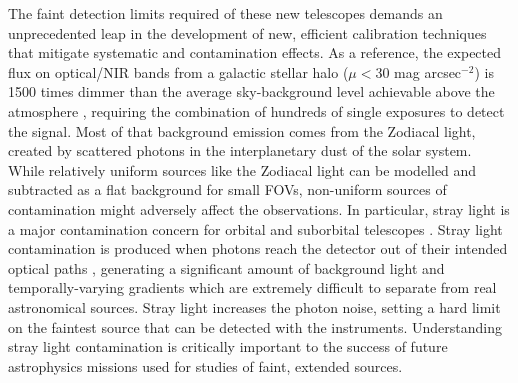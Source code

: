 \documentclass[usenames,dvipsnames,modern]{CLASS_FILES/aastex631}  %
\newcommand{\magarc}{mag arcsec\ensuremath{^{\mathrm{-2}}}}
\begin{document}
The faint detection limits required of these new telescopes demands an unprecedented leap in the development of new, efficient calibration techniques that mitigate systematic and contamination effects. As a reference, the expected flux on optical/NIR bands from a galactic stellar halo ($\mu<30$ \magarc) is 1500 times dimmer than the average sky-background level achievable above the atmosphere \citep[$\mu=22$ \magarc,][]{gill+2020aj160,borlaff+2021arxiv2108.10321}, requiring the combination of hundreds of single exposures to detect the signal. Most of that background emission comes from the Zodiacal light, created by scattered photons in the interplanetary dust of the solar system. While relatively uniform sources like the Zodiacal light can be modelled and subtracted as a flat background for small FOVs, non-uniform sources of contamination might adversely affect the observations. In particular, stray light is a major contamination concern for orbital and suborbital telescopes  \citep{bely2003book,kuntzer+2014inproceedings_91490W,mora+2016inproceedings_99042D,clermont+2021sci11_10081}.
Stray light contamination is produced when photons reach the detector out of their intended optical paths \citep{gasparvenancio+2016inproceedings_99040P}, generating a significant amount of background light and temporally-varying gradients which are extremely difficult to separate from real astronomical sources. Stray light increases the photon noise, setting a hard limit on the faintest source that can be detected with the instruments. Understanding stray light contamination is critically important to the success of future astrophysics missions used for studies of faint, extended sources.\\
\end{document}
